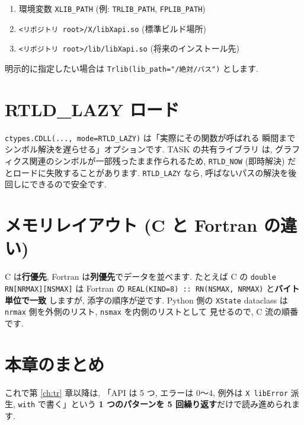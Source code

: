 \documentclass[11pt,a4paper]{report}
\begin{document}
\begin{enumerate}[leftmargin=1.5em]
  \item 環境変数 \texttt{XLIB\_PATH} (例: \texttt{TRLIB\_PATH}, \texttt{FPLIB\_PATH})
  \item \texttt{<リポジトリ root>/X/libXapi.so} (標準ビルド場所)
  \item \texttt{<リポジトリ root>/lib/libXapi.so} (将来のインストール先)
\end{enumerate}

明示的に指定したい場合は \texttt{Trlib(lib\_path="/絶対/パス")} とします.

\section{RTLD\_LAZY ロード}

\begin{note}
\texttt{ctypes.CDLL(..., mode=RTLD\_LAZY)} は「実際にその関数が呼ばれる
瞬間までシンボル解決を遅らせる」オプションです. TASK の共有ライブラリ
は, グラフィクス関連のシンボルが一部残ったまま作られるため,
\texttt{RTLD\_NOW} (即時解決) だとロードに失敗することがあります.
\texttt{RTLD\_LAZY} なら, 呼ばないパスの解決を後回しにできるので安全です.
\end{note}

\section{メモリレイアウト (C と Fortran の違い)}

\begin{warn}
C は\textbf{行優先}, Fortran は\textbf{列優先}でデータを並べます.
たとえば C の \texttt{double RN[NRMAX][NSMAX]} は Fortran の
\texttt{REAL(KIND=8) :: RN(NSMAX, NRMAX)} と\textbf{バイト単位で一致}
しますが, 添字の順序が逆です. Python 側の \texttt{XState} dataclass は
\texttt{nrmax} 側を外側のリスト, \texttt{nsmax} を内側のリストとして
見せるので, C 流の順番です.
\end{warn}

\section{本章のまとめ}

これで第 \ref{ch:tr} 章以降は, 「API は 5 つ, エラーは 0〜4, 例外は
\texttt{X lib}\texttt{Error} 派生, \texttt{with} で書く」という
\textbf{1 つのパターンを 5 回繰り返す}だけで読み進められます.

\clearpage
\end{document}
